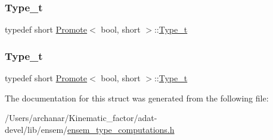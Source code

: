 \subsubsection{\texorpdfstring{Type\_t}{Type\_t}\hspace{0.1cm}{\footnotesize\ttfamily [2/3]}}
{\footnotesize\ttfamily typedef short \mbox{\hyperlink{structPromote}{Promote}}$<$ bool, short $>$\+::\mbox{\hyperlink{structPromote_3_01bool_00_01short_01_4_aca2abaabb10b6748b41ca6064716e6b4}{Type\+\_\+t}}}

\mbox{\label{structPromote_3_01bool_00_01short_01_4_aca2abaabb10b6748b41ca6064716e6b4}} 
\subsubsection{\texorpdfstring{Type\_t}{Type\_t}\hspace{0.1cm}{\footnotesize\ttfamily [3/3]}}
{\footnotesize\ttfamily typedef short \mbox{\hyperlink{structPromote}{Promote}}$<$ bool, short $>$\+::\mbox{\hyperlink{structPromote_3_01bool_00_01short_01_4_aca2abaabb10b6748b41ca6064716e6b4}{Type\+\_\+t}}}



The documentation for this struct was generated from the following file\+:\begin{DoxyCompactItemize}
\item 
/\+Users/archanar/\+Kinematic\+\_\+factor/adat-\/devel/lib/ensem/\mbox{\hyperlink{adat-devel_2lib_2ensem_2ensem__type__computations_8h}{ensem\+\_\+type\+\_\+computations.\+h}}\end{DoxyCompactItemize}
